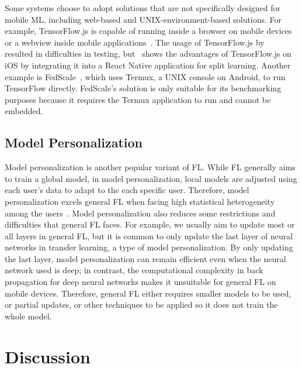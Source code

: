 \documentclass[conference]{IEEEtran}
\begin{document}
Some systems choose to adopt solutions that are not specifically designed for
mobile ML,
including web-based and UNIX-environment-based solutions.
For example,
TensorFlow.js is capable of running inside a browser on mobile devices or
a webview inside mobile applications~\cite{smilkov2019tensorflow}.
The usage of TensorFlow.js by~\cite{sriraman2022device} resulted in
difficulties in testing,
but~\cite{palanisamy2021spliteasy} shows the advantages of TensorFlow.js on iOS
by integrating it into a React Native application for split learning.
Another example is FedScale~\cite{lai2022fedscale},
which uses Termux, a UNIX console on Android,
to run TensorFlow directly.
FedScale's solution is only suitable for its benchmarking purposes because
it requires the Termux application to run and
cannot be embedded.

\subsection{Model Personalization}

Model personalization is another popular variant of FL.
While FL generally aims to train a global model,
in model personalization,
local models are adjusted using each user's data to
adapt to the each specific user.
Therefore, model personalization excels general FL when
facing high statistical heterogeneity among the users~\cite{kulkarni2020survey}.
Model personalization also reduces some restrictions and difficulties that
general FL faces.
For example,
we usually aim to update most or all layers in general FL,
but it is common to only update the last layer of neural networks in
transfer learning,
a type of model personalization.
By only updating the last layer,
model personalization can remain efficient even when
the neural network used is deep;
in contrast, the computational complexity in back propagation for
deep neural networks makes it unsuitable for general FL on mobile devices.
Therefore, general FL either requires smaller models to be used,
or partial updates,
or other techniques to be applied so it does not train the whole model.


\section{Discussion}
\end{document}
